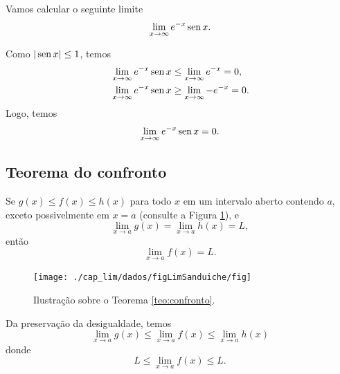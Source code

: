 \begin{ex}
  Vamos calcular o seguinte limite
  \begin{equation}
    \lim_{x\to \infty} e^{-x}\operatorname{sen} x.
  \end{equation}

  
  
  Como $|\operatorname{sen} x| \leq 1$, temos
  \begin{align}
    & \lim_{x\to \infty} e^{-x}\operatorname{sen} x \leq \lim_{x\to \infty} e^{-x} = 0,\\
    & \lim_{x\to \infty} e^{-x}\operatorname{sen} x \geq \lim_{x\to \infty} -e^{-x} = 0.
  \end{align}
  Logo, temos
  \begin{equation}
    \lim_{x\to \infty} e^{-x}\operatorname{sen} x = 0.
  \end{equation}
\end{ex}


\subsection{Teorema do confronto}


\begin{teo}\label{teo:confronto}
  Se $g(x) \leq f(x) \leq h(x)$ para todo $x$ em um intervalo aberto contendo $a$, exceto possivelmente em $x=a$ (consulte a Figura \ref{fig:limSanduiche}), e
  \begin{equation}
    \lim_{x\to a} g(x) = \lim_{x\to a} h(x) = L,
  \end{equation}
  então
  \begin{equation}
    \lim_{x\to a} f(x) = L.
  \end{equation}
\end{teo}

\begin{figure}[H]
  \centering
  \texttt{[image: ./cap\_lim/dados/figLimSanduiche/fig]}
  \caption{Ilustração sobre o Teorema \ref{teo:confronto}.}
  \label{fig:limSanduiche}
\end{figure}

\begin{dem}
  Da preservação da desigualdade, temos
  \begin{equation}
    \lim_{x\to a} g(x) \leq \lim_{x\to a} f(x) \leq \lim_{x\to a} h(x)
  \end{equation}
  donde
  \begin{equation}
    L \leq \lim_{x\to a} f(x) \leq L.
  \end{equation}
\end{dem}

